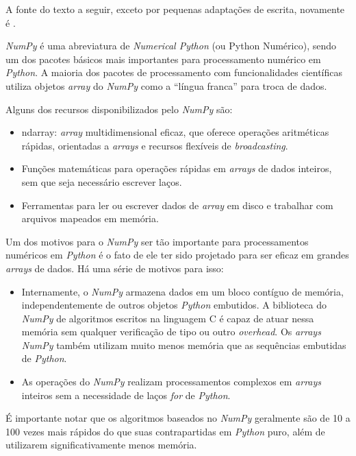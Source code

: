 \documentclass[12pt]{article}
\newcommand{\aspas}[1]{``#1''} %
\begin{document}
A fonte do texto a seguir, exceto por pequenas adaptações de escrita, novamente é \cite{mckinney:2018}.

\textit{NumPy} é uma abreviatura de \textit{Numerical Python} (ou Python Numérico), sendo um dos pacotes básicos mais importantes para processamento numérico em \textit{Python}. A maioria dos pacotes de processamento com funcionalidades científicas utiliza objetos \textit{array} do \textit{NumPy} como a \aspas{língua franca} para troca de dados.

Alguns dos recursos disponibilizados pelo \textit{NumPy} são:

\begin{itemize}
	\item ndarray: \textit{array} multidimensional eficaz, que oferece operações aritméticas rápidas, orientadas a \textit{arrays} e recursos flexíveis de \textit{broadcasting}.
	\item Funções matemáticas para operações rápidas em \textit{arrays} de dados inteiros, sem que seja necessário escrever laços.
	\item Ferramentas para ler ou escrever dados de \textit{array} em disco e trabalhar com arquivos mapeados em memória.
\end{itemize}

Um dos motivos para o \textit{NumPy} ser tão importante para processamentos numéricos em \textit{Python} é o fato de ele ter sido projetado para ser eficaz em grandes \textit{arrays} de dados. Há uma série de motivos para isso:

\begin{itemize}
	\item Internamente, o \textit{NumPy} armazena dados em um bloco contíguo de memória, independentemente de outros objetos \textit{Python} embutidos. A biblioteca do \textit{NumPy} de algoritmos escritos na linguagem C é capaz de atuar nessa memória sem qualquer verificação de tipo ou outro \textit{overhead}. Os \textit{arrays NumPy} também utilizam muito menos memória que as sequências embutidas de \textit{Python}.
	\item As operações do \textit{NumPy} realizam processamentos complexos em \textit{arrays} inteiros sem a necessidade de laços \textit{for} de \textit{Python}.
\end{itemize}

É importante notar que os algoritmos baseados no \textit{NumPy} geralmente são de 10 a 100 vezes mais rápidos do que suas contrapartidas em \textit{Python} puro, além de utilizarem significativamente menos memória.
\end{document}
